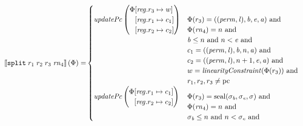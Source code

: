 \documentclass[a4paper]{article}
\begin{document}
\begin{align*}
  \sem{\tsplit{r_1}{r_2}{r_3}{\rn_4}}(\Phi) = &
                               \begin{cases}
                                 \updPcAddr{}\left(
                                   \arraycolsep=0pt
                                   \begin{array}{rl}
                                     \Phi&\updReg{r_3}{w}\\
                                         &\updReg{r_1}{c_1}\\
                                         &\updReg{r_2}{c_2}
                                   \end{array}\right)
&
                                 \arraycolsep=0pt
                                 \begin{array}[t]{l}
                                   \Phi(r_3) = ((\perm,\lin),\baddr,\eaddr,\aaddr) \tand \\
                                   \Phi(\rn_4) = n \tand\\
                                   \baddr \leq n \tand n < \eaddr \tand \\
                                   c_1 = ((\perm,\lin),\baddr,n,\aaddr) \tand \\
                                   c_2 = ((\perm,\lin),n+1,\eaddr,\aaddr) \tand \\
                                   w = \linCons{\Phi(r_3)} \tand \\
                                   r_1,r_2,r_3 \neq \pcreg
                                 \end{array}\\
                                 \updPcAddr{} \left(
                                 \arraycolsep=0pt
                                 \begin{array}{rl}
                                   \Phi&\updReg{r_1}{c_1}\\
                                       &\updReg{r_2}{c_2}
                                 \end{array} \right)
&
                                 \arraycolsep=0pt
                                 \begin{array}[t]{l}
                                   \Phi(r_3) = \seal{\sigma_\baddr,\sigma_\eaddr,\sigma} \tand \\
                                   \Phi(\rn_4) = n \tand\\
                                   \sigma_\baddr \leq n \tand n < \sigma_\eaddr \tand \\

\end{array}
\end{cases}
\end{align*}
\end{document}
